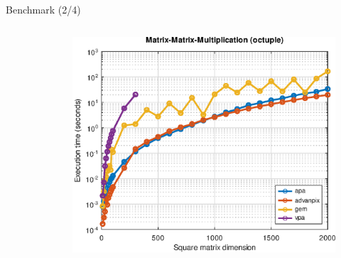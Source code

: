 \begin{frame}{Benchmark (2/4)}
\begin{columns}
\begin{column}{0.3\textwidth}
\begin{figure}
\end{figure}
\end{column}
\begin{column}{0.3\textwidth}
\begin{figure}
\centering
\includegraphics[width=1.0\linewidth]{res/data/2021-11-24_run-01-mmm-octuple-semilogy}
\end{figure}
\end{column}
\end{columns}

\end{frame}


